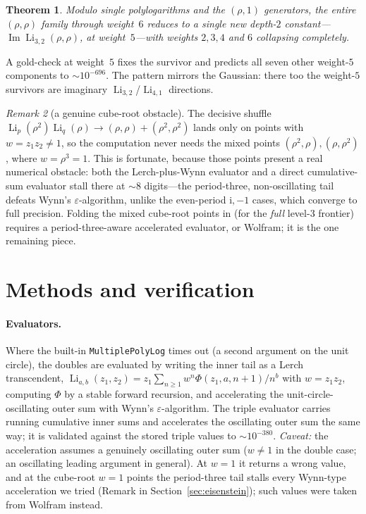 \documentclass[11pt]{article}
\DeclareMathOperator{\Li}{Li}
\DeclareMathOperator{\Imag}{Im}
\newcommand{\iu}{\mathrm{i}}
\theoremstyle{plain}
\newtheorem{theorem}{Theorem}
\theoremstyle{remark}
\newtheorem{remark}[theorem]{Remark}
\begin{document}
\begin{theorem}\label{thm:eis-1}
Modulo single polylogarithms and the $(\rho,1)$ generators, the entire $(\rho,\rho)$ family through
weight~$6$ reduces to a \emph{single} new depth-$2$ constant---$\Imag\Li_{3,2}(\rho,\rho)$, at
weight~$5$---with weights $2,3,4$ and $6$ collapsing completely.
\end{theorem}

A gold-check at weight~$5$ fixes the survivor and predicts all seven other weight-$5$ components to
${\sim}10^{-696}$. The pattern mirrors the Gaussian: there too the weight-$5$ survivors are imaginary
$\Li_{3,2}$/$\Li_{4,1}$ directions.

\begin{remark}[a genuine cube-root obstacle]
The decisive shuffle $\Li_p(\rho^2)\Li_q(\rho)\to(\rho,\rho)+(\rho^2,\rho^2)$ lands only on points with
$w=z_1z_2\neq1$, so the computation never needs the mixed points $(\rho^2,\rho),(\rho,\rho^2)$, where
$w=\rho^3=1$. This is fortunate, because those points present a real numerical obstacle: both the
Lerch-plus-Wynn evaluator and a direct cumulative-sum evaluator stall there at ${\sim}8$ digits---the
period-three, non-oscillating tail defeats Wynn's $\varepsilon$-algorithm, unlike the even-period
$\iu,-1$ cases, which converge to full precision. Folding the mixed cube-root points in (for the
\emph{full} level-$3$ frontier) requires a period-three-aware accelerated evaluator, or Wolfram; it is
the one remaining piece.
\end{remark}

\section{Methods and verification}\label{sec:methods}

\paragraph{Evaluators.} Where the built-in \texttt{MultiplePolyLog} times out (a second argument on
the unit circle), the doubles are evaluated by writing the inner tail as a Lerch transcendent,
$\Li_{a,b}(z_1,z_2)=z_1\sum_{n\ge1}w^n\Phi(z_1,a,n{+}1)/n^b$ with $w=z_1z_2$, computing $\Phi$ by a
stable forward recursion, and accelerating the unit-circle-oscillating outer sum with Wynn's
$\varepsilon$-algorithm. The triple evaluator carries running cumulative inner sums and accelerates
the oscillating outer sum the same way; it is validated against the stored triple values to
${\sim}10^{-380}$. \emph{Caveat:} the acceleration assumes a genuinely oscillating outer sum
($w\neq1$ in the double case; an oscillating leading argument in general). At $w=1$ it returns a wrong
value, and at the cube-root $w=1$ points the period-three tail stalls every Wynn-type acceleration we
tried (Remark in Section~\ref{sec:eisenstein}); such values were taken from Wolfram instead.
\end{document}
